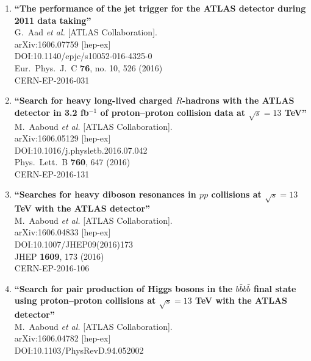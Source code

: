 \documentclass{article}
\begin{document}
\begin{enumerate}
\item%
{\bf ``The performance of the jet trigger for the ATLAS detector during 2011 data taking''}
  \\{}G.~Aad {\it et al.} [ATLAS Collaboration].
  \\{}arXiv:1606.07759 [hep-ex]
  \\{}DOI:10.1140/epjc/s10052-016-4325-0
  \\{}Eur.\ Phys.\ J.\ C {\bf 76}, no. 10, 526 (2016)
  \\{}CERN-EP-2016-031
\item%
{\bf ``Search for heavy long-lived charged $R$-hadrons with the ATLAS detector in 3.2 fb$^{-1}$ of proton--proton collision data at $\sqrt{s} = 13$ TeV''}
  \\{}M.~Aaboud {\it et al.} [ATLAS Collaboration].
  \\{}arXiv:1606.05129 [hep-ex]
  \\{}DOI:10.1016/j.physletb.2016.07.042
  \\{}Phys.\ Lett.\ B {\bf 760}, 647 (2016)
  \\{}CERN-EP-2016-131
\item%
{\bf ``Searches for heavy diboson resonances in $pp$ collisions at $\sqrt{s}=13$ TeV with the ATLAS detector''}
  \\{}M.~Aaboud {\it et al.} [ATLAS Collaboration].
  \\{}arXiv:1606.04833 [hep-ex]
  \\{}DOI:10.1007/JHEP09(2016)173
  \\{}JHEP {\bf 1609}, 173 (2016)
  \\{}CERN-EP-2016-106
\item%
{\bf ``Search for pair production of Higgs bosons in the $b\bar{b}b\bar{b}$ final state using proton--proton collisions at $\sqrt{s} = 13$ TeV with the ATLAS detector''}
  \\{}M.~Aaboud {\it et al.} [ATLAS Collaboration].
  \\{}arXiv:1606.04782 [hep-ex]
  \\{}DOI:10.1103/PhysRevD.94.052002

\end{enumerate}
\end{document}
